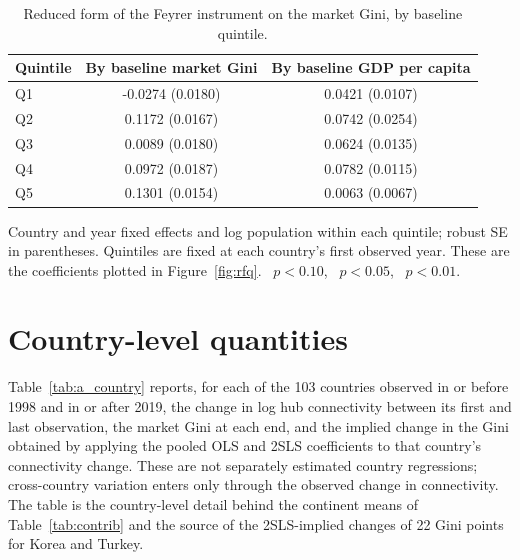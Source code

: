 \begin{table}[H]\centering\caption{Reduced form of the Feyrer instrument on the market Gini, by baseline quintile.}\label{tab:a_rfq}
\begin{threeparttable}\small\begin{tabular}{lcc}
\toprule
Quintile & By baseline market Gini & By baseline GDP per capita \\
\midrule
Q1 & -0.0274 (0.0180) & 0.0421\sym{***} (0.0107) \\
Q2 & 0.1172\sym{***} (0.0167) & 0.0742\sym{***} (0.0254) \\
Q3 & 0.0089 (0.0180) & 0.0624\sym{***} (0.0135) \\
Q4 & 0.0972\sym{***} (0.0187) & 0.0782\sym{***} (0.0115) \\
Q5 & 0.1301\sym{***} (0.0154) & 0.0063 (0.0067) \\
\bottomrule
\end{tabular}
\begin{tablenotes}\footnotesize\item Country and year fixed effects and log population within each quintile; robust SE in parentheses. Quintiles are fixed at each country's first observed year. These are the coefficients plotted in Figure~\ref{fig:rfq}. \sym{*}~$p<0.10$, \sym{**}~$p<0.05$, \sym{***}~$p<0.01$.\end{tablenotes}\end{threeparttable}\end{table}

\section{Country-level quantities}
\label{app:country}
Table~\ref{tab:a_country} reports, for each of the 103 countries observed in or before 1998 and in or after 2019, the change in log hub connectivity between its first and last observation, the market Gini at each end, and the implied change in the Gini obtained by applying the pooled OLS and 2SLS coefficients to that country's connectivity change. These are not separately estimated country regressions; cross-country variation enters only through the observed change in connectivity. The table is the country-level detail behind the continent means of Table~\ref{tab:contrib} and the source of the 2SLS-implied changes of 22 Gini points for Korea and Turkey.


